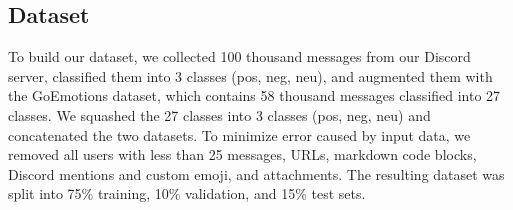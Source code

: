 \documentclass{article}
\begin{document}

\subsection{Dataset}
To build our dataset, we collected 100 thousand messages from our Discord server, classified them into 3 classes (pos, neg, neu), and augmented them with the GoEmotions\cite{demszky2020goemotions} dataset, which contains 58 thousand messages classified into 27 classes. We squashed the 27 classes into 3 classes (pos, neg, neu) and concatenated the two datasets. To minimize error caused by input data, we removed all users with less than 25 messages, URLs, markdown code blocks, Discord mentions and custom emoji, and attachments. The resulting dataset was split into 75\% training, 10\% validation, and 15\% test sets.
\end{document}
